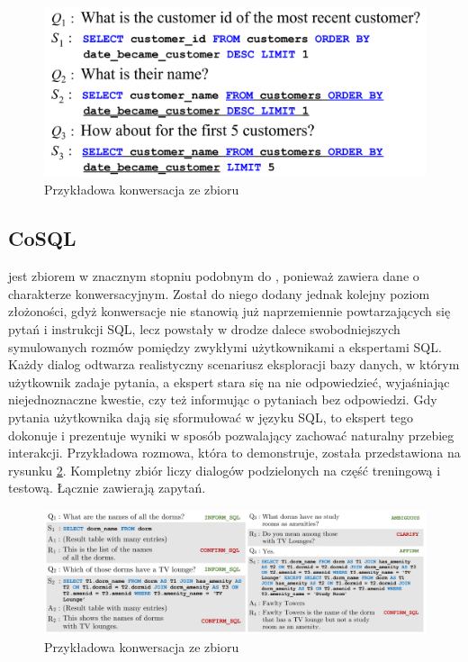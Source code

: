 \begin{figure}[ht!]
  \centering
  \includegraphics[width=0.6\linewidth]{images/sparc_example.png}
  \caption[Przykładowa konwersacja ze zbioru ]{Przykładowa konwersacja ze zbioru }
  \label{fig:sparc-example}
\end{figure}

\subsection{CoSQL}
  jest zbiorem w znacznym stopniu podobnym do , ponieważ zawiera dane o charakterze konwersacyjnym. Został do niego dodany jednak kolejny poziom złożoności, gdyż konwersacje nie stanowią już naprzemiennie powtarzających się pytań i instrukcji SQL, lecz powstały w drodze dalece swobodniejszych symulowanych rozmów pomiędzy zwykłymi użytkownikami a ekspertami SQL. Każdy dialog odtwarza realistyczny scenariusz eksploracji bazy danych, w którym użytkownik zadaje pytania, a ekspert stara się na nie odpowiedzieć, wyjaśniając niejednoznaczne kwestie, czy też informując o pytaniach bez odpowiedzi. Gdy pytania użytkownika dają się sformułować w języku SQL, to ekspert tego dokonuje i prezentuje wyniki w sposób pozwalający zachować naturalny przebieg interakcji. Przykładowa rozmowa, która to demonstruje, została przedstawiona na rysunku \ref{fig:cosql-example}. Kompletny zbiór liczy  dialogów podzielonych na część treningową i testową. Łącznie zawierają  zapytań.

\begin{figure}[ht!]
  \centering
  \includegraphics[width=1.0\linewidth]{images/cosql_example.png}
  \caption[Przykładowa konwersacja ze zbioru ]{Przykładowa konwersacja ze zbioru }
  \label{fig:cosql-example}
\end{figure}

